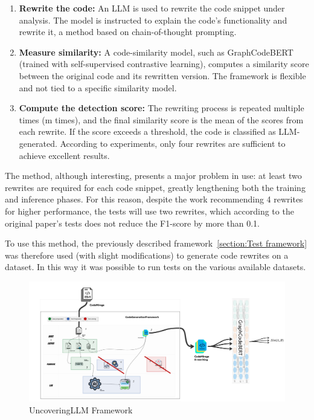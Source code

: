 \begin{enumerate}
\item \textbf{Rewrite the code:} An LLM is used to rewrite the code snippet under analysis. 
The model is instructed to explain the code’s functionality and rewrite it, a 
method based on chain-of-thought prompting.

\item \textbf{Measure similarity:} A code-similarity model, such as 
GraphCodeBERT\cite{guo2020graphcodebert} 
(trained with self-supervised contrastive learning), computes a similarity 
score between the original code and its rewritten version. The framework is 
flexible and not tied to a specific similarity model.

\item \textbf{Compute the detection score:} The rewriting process is repeated multiple times 
(m times), and the final similarity score is the mean of the scores from each 
rewrite. If the score exceeds a threshold, the code is classified as LLM-generated. 
According to experiments, only four rewrites are sufficient to achieve excellent results.
\end{enumerate}

The method, although interesting, presents a major problem in use: 
at least two rewrites are required for each code snippet, greatly 
lengthening both the training and inference phases. For this reason, 
despite the work recommending 4 rewrites for higher performance, the tests 
will use two rewrites, which according to the original paper’s tests does not 
reduce the F1-score by more than 0.1.

To use this method, the previously described framework~\ref{section:Test framework} 
was therefore used (with slight modifications) to generate code rewrites on a 
dataset. In this way it was possible to run tests on the various available datasets.
\begin{figure}[H]
    \centering
    \includegraphics[width=1\textwidth]{img/UncoveringLLM/framework.jpg}
    \caption{UncoveringLLM Framework}
    \label{fig:UncoveringLLM Framework}
\end{figure}




